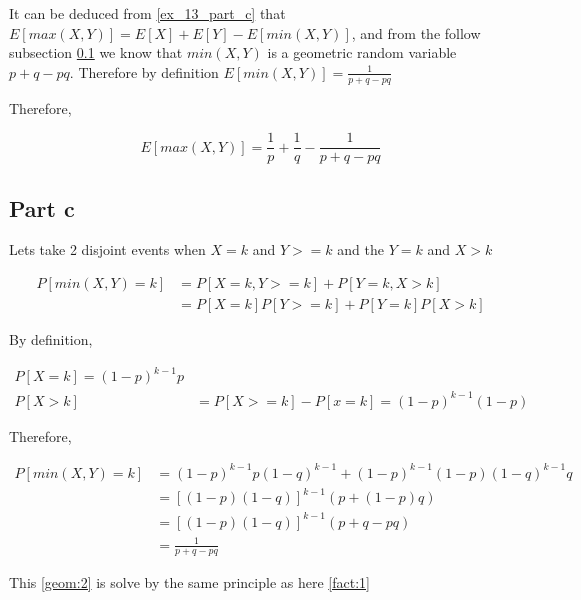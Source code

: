 \documentclass[12pt, a4paper]{article}
\begin{document}
It can be deduced from \ref{ex_13_part_c} that $E[max(X,Y)] = E[X] + E[Y] -
E[min(X,Y)]$, and from the follow subsection \ref{ex_14_part_c} we know that
$min(X,Y)$ is a geometric random variable $p + q - pq$. Therefore by definition
$E[min(X,Y)]=\frac{1}{p+q-pq}$

Therefore,

\begin{equation}
    E[max(X,Y)] = \frac{1}{p} + \frac{1}{q} - \frac{1}{p+q-pq}
\end{equation}

\subsection{Part c} \label{ex_14_part_c}

Lets take 2 disjoint events when $X = k$ and $Y >= k$ and the $Y = k$ and $X >
k$

\begin{subequations}
  \begin{align}
    P[min(X,Y) = k] &= P[X = k, Y >= k] + P[Y = k, X > k] \\
                    &= P[X=k]P[Y>=k] + P[Y=k]P[X>k]
  \end{align}
\end{subequations}

By definition,

\begin{subequations}
  \begin{align}
    P[X = k] = (1 - p)^{k-1}p \\
    P[X > k] &= P[X >= k] - P[x = k] = (1 - p)^{k-1}(1 - p)
  \end{align}
\end{subequations}

Therefore,

\begin{subequations}
  \begin{align}
    P[min(X,Y) = k] &= (1 - p)^{k-1}p(1 - q)^{k-1} + (1-p)^{k-1}(1-p)(1-q)^{k-1}q \\
                    &= [(1-p)(1-q)]^{k-1}(p+(1-p)q) \\
                    &= [(1-p)(1-q)]^{k-1}(p + q - pq) \\
                    &= \frac{1}{p + q - pq} \label{geom:2}
  \end{align}
\end{subequations}

This \ref{geom:2} is solve by the same principle as here \ref{fact:1}
\end{document}

